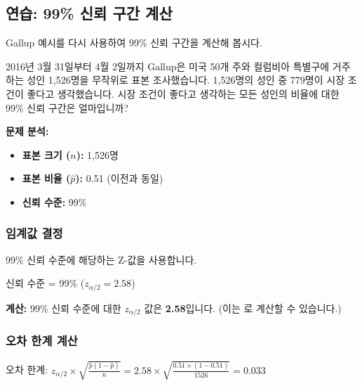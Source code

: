 \documentclass[11pt,a4paper]{article}
\theoremstyle{definition}
\begin{document}
\subsection{연습: 99\% 신뢰 구간 계산}

Gallup 예시를 다시 사용하여 99\% 신뢰 구간을 계산해 봅시다.

\begin{tcolorbox}[title=슬라이드 77: 연습]
2016년 3월 31일부터 4월 2일까지 Gallup은 미국 50개 주와 컬럼비아 특별구에 거주하는 성인 1,526명을 무작위로 표본 조사했습니다. 1,526명의 성인 중 779명이 시장 조건이 좋다고 생각했습니다.
시장 조건이 좋다고 생각하는 모든 성인의 비율에 대한 99\% 신뢰 구간은 얼마입니까?
\end{tcolorbox}

\textbf{문제 분석:}
\begin{itemize}
    \item \textbf{표본 크기 ($n$):} 1,526명
    \item \textbf{표본 비율 ($\hat{p}$):} 0.51 (이전과 동일)
    \item \textbf{신뢰 수준:} 99\%
\end{itemize}

\subsubsection{임계값 결정}

99\% 신뢰 수준에 해당하는 Z-값을 사용합니다.

\begin{tcolorbox}[title=슬라이드 78: 연습 - 풀이]
신뢰 수준 = 99\% ($z_{\alpha/2} = 2.58$)
\end{tcolorbox}

\textbf{계산:}
99\% 신뢰 수준에 대한 $z_{\alpha/2}$ 값은 \textbf{2.58}입니다. (이는 로 계산할 수 있습니다.)

\subsubsection{오차 한계 계산}

\begin{tcolorbox}[title=슬라이드 78: 연습 - 풀이]
오차 한계: $z_{\alpha/2} \times \sqrt{\frac{\hat{p}(1-\hat{p})}{n}} = 2.58 \times \sqrt{\frac{0.51 \times (1-0.51)}{1526}} = 0.033$
\end{tcolorbox}
\end{document}
